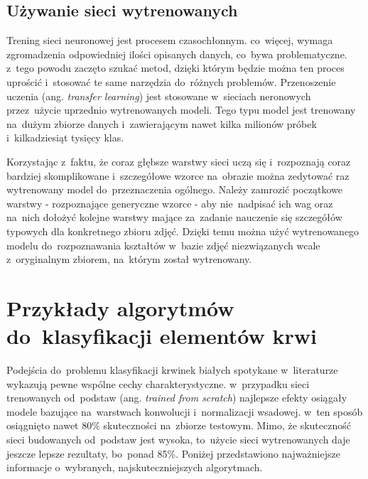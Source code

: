 \subsection{Używanie sieci wytrenowanych}

Trening sieci neuronowej jest procesem czasochłonnym. co~więcej, wymaga zgromadzenia odpowiedniej ilości opisanych danych, co~bywa problematyczne. z~tego powodu zaczęto szukać metod, dzięki którym będzie można ten proces uprościć i~stosować te same narzędzia do~różnych problemów. Przenoszenie uczenia (ang. \textit{transfer learning}) jest stosowane w~sieciach neronowych przez~użycie uprzednio wytrenowanych modeli. Tego typu model jest trenowany na~dużym zbiorze danych i~zawierającym nawet kilka milionów próbek i~kilkadziesiąt tysięcy klas. 

{\parindent0pt %
Korzystając z~faktu, że coraz głębsze warstwy sieci uczą się i~rozpoznają coraz bardziej skomplikowane i~szczegółowe wzorce na~obrazie można zedytować raz wytrenowany model do~przeznaczenia ogólnego. Należy zamrozić początkowe warstwy - rozpoznające generyczne wzorce - aby nie~nadpisać ich wag oraz na~nich dołożyć kolejne warstwy mające za~zadanie nauczenie się szczegółów typowych dla konkretnego zbioru zdjęć. Dzięki temu można użyć wytrenowanego modelu do~rozpoznawania kształtów w~bazie zdjęć niezwiązanych wcale z~oryginalnym zbiorem, na~którym został wytrenowany. 
}

\section{Przykłady algorytmów do~klasyfikacji elementów krwi}

Podejścia do~problemu klasyfikacji krwinek białych spotykane w~literaturze wykazują pewne wspólne cechy charakterystyczne. w~przypadku sieci trenowanych od~podstaw (ang. \textit{trained from scratch}) najlepsze efekty osiągały modele bazujące na~warstwach konwolucji i~normalizacji wsadowej. w~ten sposób osiągnięto nawet 80\% skuteczności na~zbiorze testowym. Mimo, że skuteczność sieci budowanych od~podstaw jest wysoka, to~użycie sieci wytrenowanych daje jeszcze lepsze rezultaty, bo~ponad 85\%. Poniżej przedstawiono najważniejsze informacje o~wybranych, najskuteczniejszych algorytmach.

